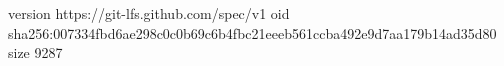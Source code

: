version https://git-lfs.github.com/spec/v1
oid sha256:007334fbd6ae298c0c0b69c6b4fbc21eeeb561ccba492e9d7aa179b14ad35d80
size 9287
